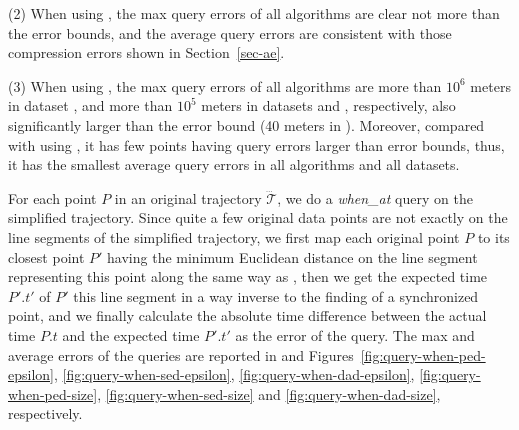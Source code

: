 {\ni (2) When using \sed, the max query errors of all algorithms are clear not more than the error bounds, and the average query errors are consistent with those compression errors shown in Section~\ref{sec-ae}.


\ni (3) When using \dad, the max query errors of all algorithms are more than $10^6$ meters in dataset \ucar, and more than $10^5$ meters in datasets \geolife and \mopsi, respectively, also significantly larger than the error bound (40 meters in ). Moreover, compared with using \ped, it has few points having query errors larger than error bounds, thus, it has the smallest average query errors in all algorithms and all datasets.



{For each point $P$ in an original trajectory $\dddot{\mathcal{T}}$, we do a \emph{when\_at} query on the simplified trajectory. Since quite a few original data points are not exactly on the line segments of the simplified trajectory, we first map each original point $P$ to its closest point $P'$ having the minimum Euclidean distance on the line segment representing this point along the same way as \cite{Cao:Spatio}, then we get the expected time $P'.t'$ of $P'$ \wrt this line segment in a way inverse to the finding of a synchronized point, and we finally calculate the absolute time difference between the actual time $P.t$ and the expected time $P'.t'$ as the error of the query.}
%
{The max and average errors of the queries are reported in  and Figures~\ref{fig:query-when-ped-epsilon}, \ref{fig:query-when-sed-epsilon}, \ref{fig:query-when-dad-epsilon}, \ref{fig:query-when-ped-size}, \ref{fig:query-when-sed-size} and \ref{fig:query-when-dad-size}, respectively.}






}
